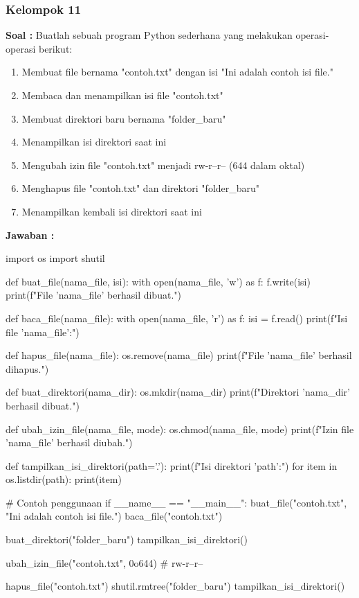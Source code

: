 \documentclass[12pt]{article}
\begin{document}
\subsubsection{Kelompok 11}
\textbf{Soal :}
Buatlah sebuah program Python sederhana yang melakukan operasi-operasi berikut:

\begin{enumerate}
    \item Membuat file bernama "contoh.txt" dengan isi "Ini adalah contoh isi file."
    \item Membaca dan menampilkan isi file "contoh.txt"
    \item Membuat direktori baru bernama "folder\_baru"
    \item Menampilkan isi direktori saat ini
    \item Mengubah izin file "contoh.txt" menjadi rw-r--r-- (644 dalam oktal)
    \item Menghapus file "contoh.txt" dan direktori "folder\_baru"
    \item Menampilkan kembali isi direktori saat ini
\end{enumerate}

\textbf{Jawaban :}
\begin{python}
import os
import shutil

def buat_file(nama_file, isi):
    with open(nama_file, 'w') as f:
        f.write(isi)
    print(f"File '{nama_file}' berhasil dibuat.")

def baca_file(nama_file):
    with open(nama_file, 'r') as f:
        isi = f.read()
    print(f"Isi file '{nama_file}':")

def hapus_file(nama_file):
    os.remove(nama_file)
    print(f"File '{nama_file}' berhasil dihapus.")

def buat_direktori(nama_dir):
    os.mkdir(nama_dir)
    print(f"Direktori '{nama_dir}' berhasil dibuat.")

def ubah_izin_file(nama_file, mode):
    os.chmod(nama_file, mode)
    print(f"Izin file '{nama_file}' berhasil diubah.")

def tampilkan_isi_direktori(path='.'):
    print(f"Isi direktori '{path}':")
    for item in os.listdir(path):
        print(item)

# Contoh penggunaan
if __name__ == "__main__":
    buat_file("contoh.txt", "Ini adalah contoh isi file.")
    baca_file("contoh.txt")
    
    buat_direktori("folder_baru")
    tampilkan_isi_direktori()
    
    ubah_izin_file("contoh.txt", 0o644)  # rw-r--r--
    
    hapus_file("contoh.txt")
    shutil.rmtree("folder_baru")
    tampilkan_isi_direktori()
\end{python}
\end{document}
